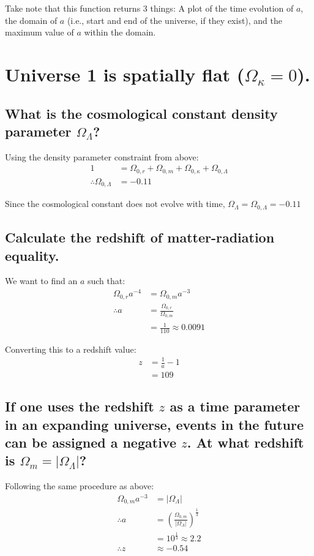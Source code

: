 \documentclass[a4paper]{scrartcl}
\begin{document}
Take note that this function returns 3 things: A plot of the time evolution of \(a\), the domain of \(a\) (i.e., start and end of the universe, if they exist), and the maximum value of \(a\) within the domain.

\section{Universe 1 is spatially flat (\(\Omega_\kappa = 0\)).}
\subsection{What is the cosmological constant density parameter \(\Omega_\Lambda\)?}
Using the density parameter constraint from above:
\begin{align*}
    1 &= \Omega_{0, r} + \Omega_{0, m} + \Omega_{0, \kappa} + \Omega_{0, \Lambda} \\
    \therefore \Omega_{0, \Lambda} &= -0.11
\end{align*}

Since the cosmological constant does not evolve with time, \(\Omega_\Lambda = \Omega_{0, \Lambda} = -0.11\)

\subsection{Calculate the redshift of matter-radiation equality.}
We want to find an \(a\) such that:
\begin{align*}
    \Omega_{0, r} a^{-4} &= \Omega_{0, m} a^{-3} \\
    \therefore a &= \frac{\Omega_{0, r}}{\Omega_{0, m}} \\
    &= \frac{1}{110} \approx 0.0091
\end{align*}

Converting this to a redshift value:
\begin{align*}
    z &= \frac{1}{a} - 1 \\
    &= 109
\end{align*}

\subsection{If one uses the redshift \(z\) as a time parameter in an expanding universe, events in the future can be assigned a negative \(z\). At what redshift is \(\Omega_m = |\Omega_\Lambda|\)?}
Following the same procedure as above:
\begin{align*}
    \Omega_{0, m} a^{-3} &= |\Omega_\Lambda| \\
    \therefore a &= \left(\frac{\Omega_{0, m}}{|\Omega_\Lambda|}\right)^{\frac{1}{3}} \\
    &= 10^{\frac{1}{3}} \approx 2.2 \\
    \therefore z &\approx -0.54
\end{align*}
\end{document}
